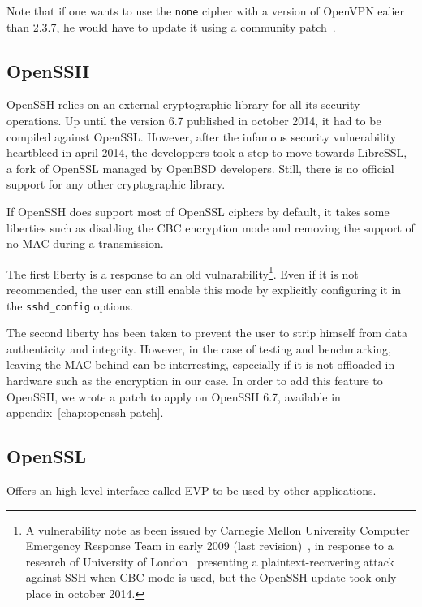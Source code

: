 \noindent Note that if one wants to use the \texttt{none} cipher with a version of OpenVPN ealier than 2.3.7, he would have to update it using a community patch~\cite{openvpn-patch-none}.


\subsection{OpenSSH}
OpenSSH relies on an external cryptographic library for all its security operations.
Up until the version 6.7 published in october 2014, it had to be compiled against OpenSSL.
However, after the infamous security vulnerability heartbleed in april 2014, the developpers took a step to move towards LibreSSL, a fork of OpenSSL managed by OpenBSD  developers.
Still, there is no official support for any other cryptographic library.

If OpenSSH does support most of OpenSSL ciphers by default, it takes some liberties such as disabling the CBC encryption mode and removing the support of no MAC during a transmission.

\noindent The first liberty is a response to an old vulnarability\footnote{A vulnerability note as been issued by Carnegie Mellon University Computer Emergency Response Team in early 2009 (last revision)~\cite{CERT2009}, in response to a research of University of London~\cite{Albrecht:2009} presenting a plaintext-recovering attack against SSH when CBC mode is used, but the OpenSSH update took only place in october 2014.}.
Even if it is not recommended, the user can still enable this mode by explicitly configuring it in the \texttt{sshd\_config} options.

\noindent The second liberty has been taken to prevent the user to strip himself from data authenticity and integrity.
However, in the case of testing and benchmarking, leaving the MAC behind can be interresting, especially if it is not offloaded in hardware such as the encryption in our case.
In order to add this feature to OpenSSH, we wrote a patch to apply on OpenSSH 6.7, available in appendix~\ref{chap:openssh-patch}.




\subsection{OpenSSL}

Offers an high-level interface called EVP to be used by other applications.


